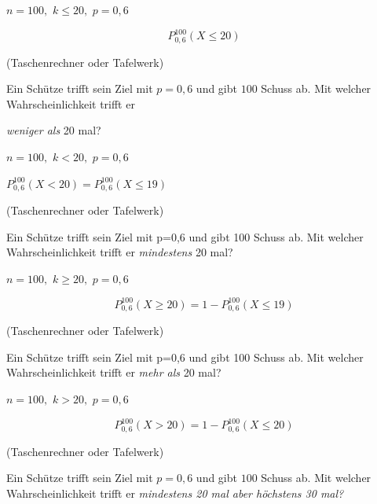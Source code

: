 \documentclass[paper=a6,ngerman,twoside=true,fontsize=14pt, parskip = half]{scrartcl}
\begin{document}
\begin{antwort}
	$n=100,$ $k\leq20,$ $p=0,6$
	
	\bigskip
	\[P^{100}_{0,6}(X\leq 20)\]
	
	(Taschenrechner oder Tafelwerk)
	
\end{antwort}
\begin{frage}
	Ein Schütze trifft sein Ziel mit $p=0,6$ und gibt $100$ Schuss ab. Mit welcher Wahrscheinlichkeit trifft er 
	
	\emph{weniger als} 20 mal?
	
\end{frage}
\begin{antwort}
	$n=100,$ $k<20,$ $p=0,6$
	
	\bigskip
	$P^{100}_{0,6}(X<20)=P^{100}_{0,6}(X\leq19)$
	
	(Taschenrechner oder Tafelwerk)
	
\end{antwort}
\begin{frage}
	Ein Schütze trifft sein Ziel mit p=0,6 und gibt 100 Schuss ab. Mit welcher Wahrscheinlichkeit trifft er 
	\emph{mindestens} 20 mal?
	
\end{frage}
\begin{antwort}
	$n=100,$ $k\geq20,$ $p=0,6$
	
	\bigskip
	\[P^{100}_{0,6}(X\geq 20)=1-P^{100}_{0,6}(X\leq 19)\]
	
	 (Taschenrechner oder Tafelwerk)
	
\end{antwort}
\begin{frage}
	Ein Schütze trifft sein Ziel mit p=0,6 und gibt 100 Schuss ab. Mit welcher Wahrscheinlichkeit trifft er 
	\emph{mehr als} 20 mal?
	
\end{frage}
\begin{antwort}
	$n=100,$ $k>20,$ $p=0,6$
	
	\bigskip
	\[P^{100}_{0,6}(X>20)
	=1-P^{100}_{0,6}(X\leq 20)\]
	
	(Taschenrechner oder Tafelwerk)
	
\end{antwort}
\begin{frage}
	Ein Schütze trifft sein Ziel mit $p=0,6$ und gibt $100$ Schuss ab. 
	Mit welcher Wahrscheinlichkeit trifft er 
	\emph{mindestens 20 mal aber höchstens 30 mal?}
	
\end{frage}
\end{document}
